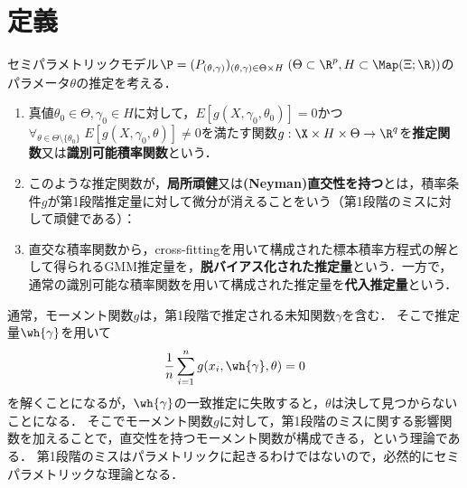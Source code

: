\documentclass[uplatex,dvipdfmx]{jsreport}
\begin{document}
\section{定義}

\begin{definition}
    セミパラメトリックモデル$\P=(P_{(\theta,\gamma)})_{(\theta,\gamma)\in\Theta\times H}\;(\Theta\subset\R^p,H\subset\Map(\Xi;\R))$のパラメータ$\theta$の推定を考える．
    \begin{enumerate}
        \item 真値$\theta_0\in\Theta,\gamma_0\in H$に対して，$E[g(X,\gamma_0,\theta_0)]=0$かつ$\forall_{\theta\in\Theta\setminus\{\theta_0\}}\;E[g(X,\gamma_0,\theta)]\ne 0$を満たす関数$g:\X\times H\times\Theta\to\R^q$を\textbf{推定関数}\cite{Bickel-Kwon01-QandA}又は\textbf{識別可能積率関数}\cite{Chernozhukov-Ichimura-Newey22-LocallyRobust}という．
        \item このような推定関数が，\textbf{局所頑健}又は\textbf{(Neyman)直交性を持つ}\cite{Chernozhukov-Ichimura-Newey22-LocallyRobust}とは，積率条件$g$が第1段階推定量に対して微分が消えることをいう（第1段階のミスに対して頑健である）：
        \item 直交な積率関数から，cross-fittingを用いて構成された標本積率方程式の解として得られるGMM推定量を，\textbf{脱バイアス化された推定量}という．一方で，通常の識別可能な積率関数を用いて構成された推定量を\textbf{代入推定量}という．
    \end{enumerate}
\end{definition}
\begin{remarks}
    通常，モーメント関数$g$は，第1段階で推定される未知関数$\gamma$を含む．
    そこで推定量$\wh{\gamma}$を用いて
    \[\frac{1}{n}\sum_{i=1}^ng(x_i,\wh{\gamma},\theta)=0\]
    を解くことになるが，$\wh{\gamma}$の一致推定に失敗すると，$\theta$は決して見つからないことになる．
    そこでモーメント関数$g$に対して，第1段階のミスに関する影響関数を加えることで，直交性を持つモーメント関数が構成できる，という理論である．
    第1段階のミスはパラメトリックに起きるわけではないので，必然的にセミパラメトリックな理論となる．
\end{remarks}
\end{document}
